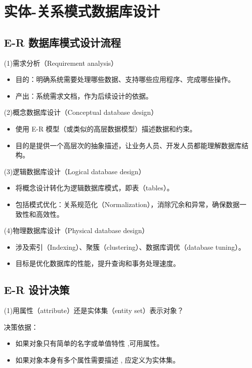 \section{实体-关系模式数据库设计}

\subsection{E-R 数据库模式设计流程}

(1)需求分析（Requirement analysis）
\begin{itemize}
    \item 目的：明确系统需要处理哪些数据、支持哪些应用程序、完成哪些操作。
    \item 产出：系统需求文档，作为后续设计的依据。
\end{itemize}

(2)概念数据库设计（Conceptual database design）
\begin{itemize}
    \item 使用 E-R 模型（或类似的高层数据模型）描述数据和约束。
    \item 目的是提供一个高层次的抽象描述，让业务人员、开发人员都能理解数据库结构。
\end{itemize}

(3)逻辑数据库设计（Logical database design）
\begin{itemize}
    \item 将概念设计转化为逻辑数据库模式，即表（tables）。
    \item 包括模式优化：关系规范化（Normalization），消除冗余和异常，确保数据一致性和高效性。
\end{itemize}

(4)物理数据库设计（Physical database design）
\begin{itemize}
    \item 涉及索引（Indexing）、聚簇（clustering）、数据库调优（database tuning）。
    \item 目标是优化数据库的性能，提升查询和事务处理速度。
\end{itemize}

\subsection{E-R 设计决策}

(1)用属性（attribute）还是实体集（entity set）表示对象？

决策依据：
\begin{itemize}
    \item 如果对象只有简单的名字或单值特性 ,可用属性。
    \item 如果对象本身有多个属性需要描述 , 应定义为实体集。
\end{itemize}

